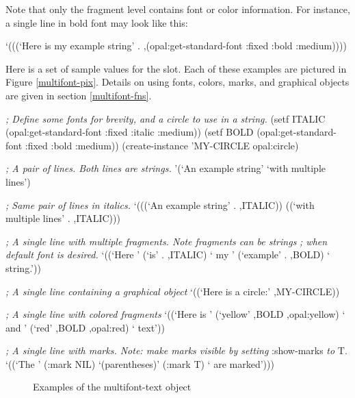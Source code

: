 Note that only the fragment level contains font or color information.
For instance, a single line in bold font may look like this:


\begin{programexample}
 `(((`Here is my example string' . ,(opal:get-standard-font :fixed :bold :medium))))
\end{programexample}

\begin{group}
Here is a set of sample values for the  slot.  Each
of these examples are pictured in Figure \ref{multifont-pix}.  Details
on using fonts, colors, marks, and graphical objects are given in
section \ref{multifont-fns}.

\begin{programexample}
{\it ; Define some fonts for brevity, and a circle to use in a string.}
(setf ITALIC (opal:get-standard-font :fixed :italic :medium))
(setf BOLD   (opal:get-standard-font :fixed :bold :medium))
(create-instance 'MY-CIRCLE opal:circle)

{\it ; A pair of lines.  Both lines are strings.}
'(`An example string' `with multiple lines')

{\it ; Same pair of lines in italics.}
`(((`An example string' . ,ITALIC))
  ((`with multiple lines' . ,ITALIC)))

{\it ; A single line with multiple fragments.  Note fragments can be strings}
{\it ; when default font is desired.}
`((`Here ' (`is' . ,ITALIC) ` my ' (`example' . ,BOLD) ` string.'))

{\it ; A single line containing a graphical object}
`((`Here is a circle:' ,MY-CIRCLE))

{\it ; A single line with colored fragments}
`((`Here is ' (`yellow' ,BOLD ,opal:yellow) ` and ' (`red' ,BOLD ,opal:red) ` text'))

{\it ; A single line with marks.  Note: make marks visible by setting} :show-marks {\it to} T.
`((`The ' (:mark NIL) `(parentheses)' (:mark T) ` are marked')))
\end{programexample}
\end{group}

\begin{figure}
\begin{center}
\end{center}
\caption{Examples of the multifont-text object}
\end{figure}



